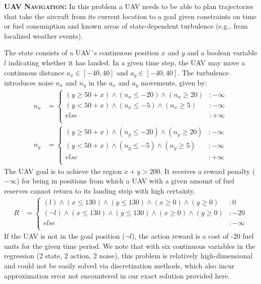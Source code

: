 \documentclass[letterpaper]{article}
\begin{document}
{\bf \textsc{UAV Navigation}:}
In this problem a UAV needs to be able to plan trajectories that take
the aircraft from its current location to a goal given constraints on
time or fuel consumption and known areas of state-dependent turbulence
(e.g., from localized weather events).

The state consists of a UAV´s continuous position $x$ and $y$ and a
boolean variable $l$ indicating whether it has landed.  In a given
time step, the UAV may move a continuous distance $a_x \in [-40,40]$
and $a_y \in [-40,40]$. The turbulence introduces noise $n_x$ and
$n_y$ in the $a_x$ and $a_y$ movements, given by: {\footnotesize
\begin{align*}
n_x & = \begin{cases}
(y \geq 50 + x) \wedge (n_x \leq -20) \wedge (n_x \geq 20) &:-\infty\\
(y < 50 + x) \wedge (n_x \leq -5) \wedge (n_x \geq 5) &:-\infty\\
else &: +\infty\\
\end{cases}\\
n_y & = \begin{cases}
(y \geq 50 + x) \wedge (n_y \leq -20) \wedge (n_y \geq 20) &:-\infty\\
(y < 50 + x) \wedge (n_y \leq -5) \wedge (n_y \geq 5) &:-\infty\\
else &: +\infty\\
\end{cases}
\end{align*}}
The UAV goal is to achieve the region $x+y > 200$. It receives a
reward penalty ($-\infty$) for being in positions from which a UAV
with a given amount of fuel reserves cannot return to its landing
strip with high certainty. 
{\footnotesize
\begin{align*}
R & = \begin{cases}
(l) \wedge (x \leq 130) \wedge (y \leq 130) \wedge (x \geq 0) \wedge (y \geq 0) & \!\! :0\\
(\neg l) \wedge (x \leq 130) \wedge (y \leq 130) \wedge (x \geq 0) \wedge (y \geq 0) & \!\! :-20\\
else &: -\infty\\
\end{cases}
\end{align*}}
If the UAV is not in the goal position ($\neg l$), the action
reward is a cost of -20 fuel units for the given time period.  We note that
with six continuous variables in the regression (2 state, 2 action, 2 noise),
this problem is relatively high-dimensional and could not be easily solved
via discretization methods, which also incur approximation error not encountered
in our exact solution provided here.
\end{document}
